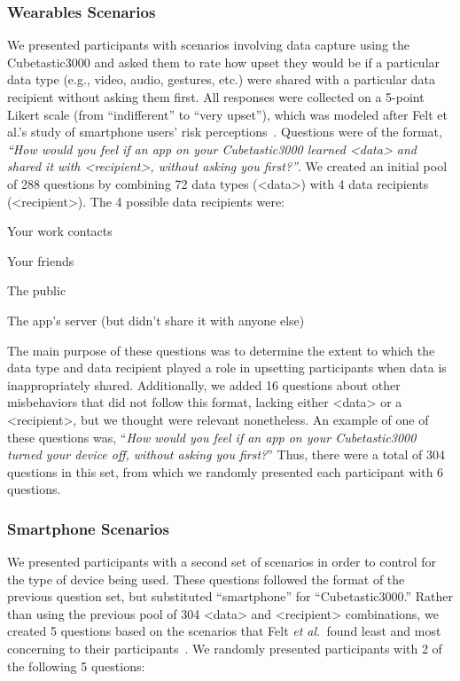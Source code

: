 \documentclass{acm_proc_article-sp}
\def\etal{{\it et al.~}}
\newenvironment{packed_item}{
\begin{itemize}
  \setlength{\itemsep}{1pt}
  \setlength{\parskip}{0pt}
  \setlength{\parsep}{0pt}
}{\end{itemize}}
\begin{document}
\subsubsection{Wearables Scenarios}
We presented participants with scenarios involving data capture using the Cubetastic3000 and asked them to rate how upset they would be if a particular data type (e.g., video, audio, gestures, etc.) were shared with a particular data recipient without asking them first. All responses were collected on a 5-point Likert scale (from ``indifferent'' to ``very upset''), which was modeled after Felt et al.'s study of smartphone users' risk perceptions~\cite{Felt}. Questions were of the format, \textit{``How would you feel if an app on your Cubetastic3000 learned <data> and shared it with <recipient>, without asking you first?''}. We created an initial pool of 288 questions by combining 72 data types (<data>) with 4 data recipients (<recipient>). The 4 possible data recipients were:  \\[-.8cm]

\begin{packed_item}
\item Your work contacts
\item Your friends
\item The public
\item The app's server (but didn't share it with anyone else)
\end{packed_item}

The main purpose of these questions was to determine the extent to which the data type and data recipient played a role in upsetting participants when data is inappropriately shared. Additionally, we added 16 questions about other misbehaviors that did not follow this format, lacking either <data> or a <recipient>, but we thought were relevant nonetheless. An example of one of these questions was, ``\textit{How would you feel if an app on your Cubetastic3000 turned your device off, without asking you first?}'' Thus, there were a total of 304 questions in this set, from which we randomly presented each participant with 6 questions.

\subsubsection{Smartphone Scenarios}
\label{sec:smartphones}
We presented participants with a second set of scenarios in order to control for the type of device being used. These questions followed the format of the previous question set, but substituted ``smartphone'' for ``Cubetastic3000.'' Rather than using the previous pool of 304 <data> and <recipient> combinations, we created 5 questions based on the scenarios that Felt \etal found least and most concerning to their participants~\cite{Felt}. We randomly presented participants with 2 of the following 5 questions: \\[-.8cm]
\end{document}
